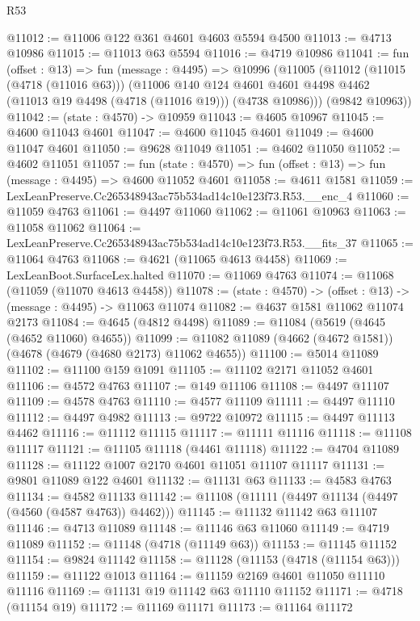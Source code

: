 \begin{lexlean}{R53}
\begin{coremodule}
@11012 := @11006 @122 @361 @4601 @4603 @5594 @4500
@11013 := @4713 @10986
@11015 := @11013 @63 @5594
@11016 := @4719 @10986
@11041 := fun (offset : @13) =>
  fun (message : @4495) =>
  @10996
    (@11005
      (@11012
        (@11015 (@4718 (@11016 @63)))
        (@11006
          @140
          @124
          @4601
          @4601
          @4498
          @4462
          (@11013 @19 @4498 (@4718 (@11016 @19)))
          (@4738 @10986)))
      (@9842 @10963))
@11042 := (state : @4570) -> @10959
@11043 := @4605 @10967
@11045 := @4600 @11043 @4601
@11047 := @4600 @11045 @4601
@11049 := @4600 @11047 @4601
@11050 := @9628 @11049
@11051 := @4602 @11050
@11052 := @4602 @11051
@11057 := fun (state : @4570) => fun (offset : @13) => fun (message : @4495) => @4600 @11052 @4601
@11058 := @4611 @1581
@11059 := LexLeanPreserve.Cc265348943ac75b534ad14c10e123f73.R53.__enc_4
@11060 := @11059 @4763
@11061 := @4497 @11060
@11062 := @11061 @10963
@11063 := @11058 @11062
@11064 := LexLeanPreserve.Cc265348943ac75b534ad14c10e123f73.R53.__fits_37
@11065 := @11064 @4763
@11068 := @4621 (@11065 @4613 @4458)
@11069 := LexLeanBoot.SurfaceLex.halted
@11070 := @11069 @4763
@11074 := @11068 (@11059 (@11070 @4613 @4458))
@11078 := (state : @4570) -> (offset : @13) -> (message : @4495) -> @11063 @11074
@11082 := @4637 @1581 @11062 @11074 @2173
@11084 := @4645 (@4812 @4498)
@11089 := @11084 (@5619 (@4645 (@4652 @11060) @4655))
@11099 := @11082 @11089 (@4662 (@4672 @1581)) (@4678 (@4679 (@4680 @2173) @11062 @4655))
@11100 := @5014 @11089
@11102 := @11100 @159 @1091
@11105 := @11102 @2171 @11052 @4601
@11106 := @4572 @4763
@11107 := @149 @11106
@11108 := @4497 @11107
@11109 := @4578 @4763
@11110 := @4577 @11109
@11111 := @4497 @11110
@11112 := @4497 @4982
@11113 := @9722 @10972
@11115 := @4497 @11113 @4462
@11116 := @11112 @11115
@11117 := @11111 @11116
@11118 := @11108 @11117
@11121 := @11105 @11118 (@4461 @11118)
@11122 := @4704 @11089
@11128 := @11122 @1007 @2170 @4601 @11051 @11107 @11117
@11131 := @9801 @11089 @122 @4601
@11132 := @11131 @63
@11133 := @4583 @4763
@11134 := @4582 @11133
@11142 := @11108 (@11111 (@4497 @11134 (@4497 (@4560 (@4587 @4763)) @4462)))
@11145 := @11132 @11142 @63 @11107
@11146 := @4713 @11089
@11148 := @11146 @63 @11060
@11149 := @4719 @11089
@11152 := @11148 (@4718 (@11149 @63))
@11153 := @11145 @11152
@11154 := @9824 @11142
@11158 := @11128 (@11153 (@4718 (@11154 @63)))
@11159 := @11122 @1013
@11164 := @11159 @2169 @4601 @11050 @11110 @11116
@11169 := @11131 @19 @11142 @63 @11110 @11152
@11171 := @4718 (@11154 @19)
@11172 := @11169 @11171
@11173 := @11164 @11172

\end{coremodule}
\end{lexlean}
